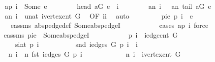 \begin{isabellebody}
\ \ \ \ \ \ \ \ {\isachardoublequoteopen}{\isacharquery}ap\ {\isacharquery}i\ {\isacharequal}\ Some\ e{\isachardoublequoteclose}\isanewline
\ \ \ \ \ \ \ \ {\isachardoublequoteopen}head\ {\isacharquery}aG\ e\ {\isacharequal}\ {\isacharquery}i{\isachardoublequoteclose}\isanewline
\ \ \ \ \ \ \ \ {\isachardoublequoteopen}{\isacharquery}an\ {\isacharquery}i\ {\isacharequal}\ \ {\isacharquery}an\ {\isacharparenleft}tail\ {\isacharquery}aG\ e{\isacharparenright}\ {\isacharplus}\ {}{\isachardoublequoteclose}\isanewline
\ \ \ \ \ \ \ \ {\isachardoublequoteopen}{\isacharquery}an\ {\isacharquery}i\ {\isacharless}\ unat\ {\isacharparenleft}ivertex{\isacharunderscore}cnt\ G{\isacharparenright}{\isachardoublequoteclose}\ \isamarkupfalse%
\ {\isacharasterisk}{\isacharbrackleft}OF\ ii{\isacharbrackright}\ \isamarkupfalse%
\ auto\ \isanewline
\ \ \ \ \ \ \isamarkupfalse%
\ pi{\isacharunderscore}e{\isacharcolon}\ {\isachardoublequoteopen}p\ {\isacharquery}i\ {\isacharequal}\ e{\isachardoublequoteclose}\ \isanewline
\ \ \ \ \ \ \ \ \isamarkupfalse%
\ e{\isacharunderscore}assms{\isacharparenleft}{}{\isacharparenright}\ abs{\isacharunderscore}pedge{\isacharunderscore}def\ Some{\isacharunderscore}abs{\isacharunderscore}pedgeI\ \isanewline
\ \ \ \ \ \ \ \ \isamarkupfalse%
\ {\isacharparenleft}cases\ {\isachardoublequoteopen}{\isacharquery}ap\ {\isacharquery}i{\isachardoublequoteclose}{\isacharparenright}\ force{\isacharplus}\isanewline
\ \ \ \ \ \ \isamarkupfalse%
\ e{\isacharunderscore}assms\ pi{\isacharunderscore}e\ \ Some{\isacharunderscore}abs{\isacharunderscore}pedgeI\ \isamarkupfalse%
\ \isanewline
\ \ \ \ \ \ \ \ {\isachardoublequoteopen}p\ {\isacharquery}i\ {\isacharless}\ iedge{\isacharunderscore}cnt\ G\ {\isasymand}\ \isanewline
\ \ \ \ \ \ \ \ \ {}\ {\isasymle}\ sint\ {\isacharparenleft}p\ {\isacharquery}i{\isacharparenright}\ {\isasymand}\isanewline
\ \ \ \ \ \ \ \ \ snd\ {\isacharparenleft}iedges\ G\ {\isacharparenleft}p\ {\isacharquery}i{\isacharparenright}{\isacharparenright}\ {\isacharequal}\ {\isacharquery}i\ {\isasymand}\ \isanewline
\ \ \ \ \ \ \ \ \ n\ {\isacharquery}i\ {\isacharequal}\ n\ {\isacharparenleft}fst\ {\isacharparenleft}iedges\ G\ {\isacharparenleft}p\ {\isacharquery}i{\isacharparenright}{\isacharparenright}{\isacharparenright}\ {\isacharplus}\ {}\ {\isasymand}\isanewline
\ \ \ \ \ \ \ \ \ n\ {\isacharquery}i\ {\isacharless}\ ivertex{\isacharunderscore}cnt\ G\ {\isasymand}\isanewline

\end{isabellebody}

